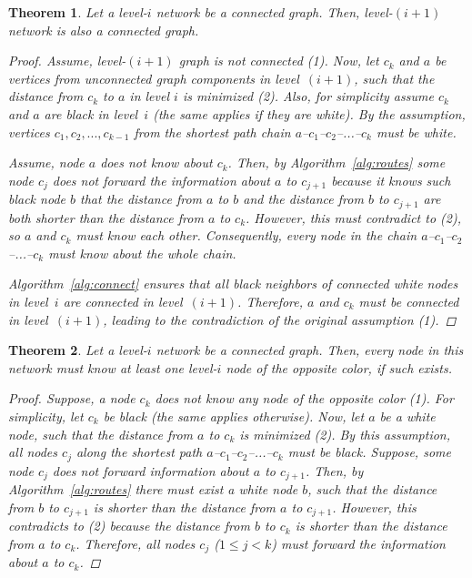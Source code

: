 \documentclass[14pt]{extarticle}
\newtheorem{thm}{Theorem}
\theoremstyle{definition}
\begin{document}
\begin{thm}
    Let a level-$i$ network be a connected graph. Then, level-$(i+1)$ network is also a connected graph.

    \begin{proof}
        Assume, level-$(i+1)$ graph is not connected (1). Now, let $c_k$ and $a$ be vertices from unconnected graph components in level~$(i+1)$, such that the distance from $c_k$ to $a$ in level $i$ is minimized (2). Also, for simplicity assume $c_k$ and $a$ are black in level~$i$ (the same applies if they are white). By the assumption, vertices $c_1,c_2,...,c_{k-1}$ from the shortest path chain $a$--$c_1$--$c_2$--...--$c_k$ must be white.

        Assume, node $a$ does not know about $c_k$. Then, by Algorithm~\ref{alg:routes} some node $c_j$ does not forward the information about $a$ to $c_{j+1}$ because it knows such black node $b$ that the distance from $a$ to $b$ and the distance from $b$ to $c_{j+1}$ are both shorter than the distance from $a$ to $c_k$. However, this must contradict to (2), so $a$ and $c_k$ must know each other. Consequently, every node in the chain $a$--$c_1$--$c_2$--...--$c_k$ must know about the whole chain.

        Algorithm~\ref{alg:connect} ensures that all black neighbors of connected white nodes in level~$i$ are connected in level~$(i+1)$. Therefore, $a$ and $c_k$ must be connected in level~$(i+1)$, leading to the contradiction of the original assumption (1).
    \end{proof}

    \label{thm:connectivity-levels}
\end{thm}

\begin{thm}
    Let a level-$i$ network be a connected graph. Then, every node in this network must know at least one level-$i$ node of the opposite color, if such exists.

    \begin{proof}
        Suppose, a node $c_k$ does not know any node of the opposite color (1). For simplicity, let $c_k$ be black (the same applies otherwise). Now, let $a$ be a white node, such that the distance from $a$ to $c_k$ is minimized (2). By this assumption, all nodes $c_j$ along the shortest path $a$--$c_1$--$c_2$--...--$c_k$ must be black. Suppose, some node $c_j$ does not forward information about $a$ to $c_{j+1}$. Then, by Algorithm~\ref{alg:routes} there must exist a white node $b$, such that the distance from $b$ to $c_{j+1}$ is shorter than the distance from $a$ to $c_{j+1}$. However, this contradicts to (2) because the distance from $b$ to $c_k$ is shorter than the distance from $a$ to $c_k$. Therefore, all nodes $c_j$ ($1 \le j < k$) must forward the information about $a$ to $c_k$.
    \end{proof}

    \label{thm:connectivity-colors}
\end{thm}
\end{document}
